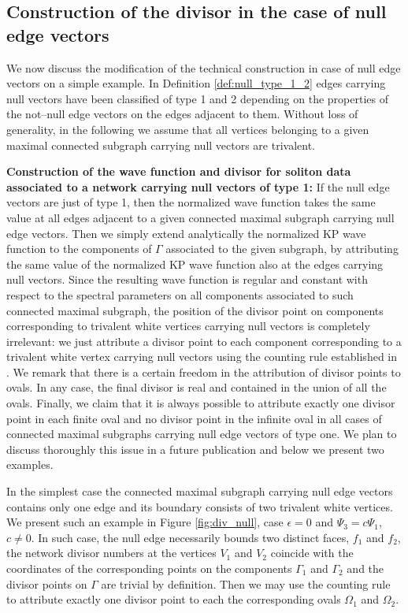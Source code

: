 \documentclass[11pt]{amsart}
\theoremstyle{plain}
\numberwithin{equation}{section}
\begin{document}
\subsection{Construction of the divisor in the case of null edge vectors}\label{sec:constr_null}
We now  discuss the modification of the technical construction in case of null edge vectors on a simple example.
In Definition \ref{def:null_type_1_2} edges carrying null vectors have been classified of type 1 and 2 depending on the properties of the not--null edge vectors on the edges adjacent to them. Without loss of generality, in the following we assume that all vertices belonging to a given maximal connected subgraph carrying null vectors are trivalent.

\textbf{Construction of the wave function and divisor for soliton data associated to a network carrying null vectors of type 1:}
If the null edge vectors are just of type 1, then the normalized wave function takes the same value at all edges adjacent to a given connected maximal subgraph carrying null edge vectors. Then we simply extend analytically the normalized KP wave function to the components of $\Gamma$ associated to the given subgraph, by attributing the same value of the normalized KP wave function also at the edges carrying null vectors. Since the resulting wave function is regular and constant with respect to the spectral parameters on all components associated to such connected maximal subgraph, 
the position of the divisor point on components corresponding to trivalent white vertices carrying null vectors is completely irrelevant: we just attribute a divisor point to each component corresponding to a trivalent white vertex carrying null vectors using the counting rule established in \cite{AG1}. We remark that there is a certain freedom in the attribution of divisor points to ovals. In any case, the final divisor is real and contained in the union of all the ovals. Finally, we claim that it is always possible to attribute exactly one divisor point in each finite oval and no divisor point in the infinite oval in all cases of connected maximal subgraphs carrying null edge vectors of type one. We plan to discuss thoroughly this issue in a future publication and below we present two examples.

In the simplest case the connected maximal subgraph carrying null edge vectors contains only one edge and its boundary consists of two trivalent white vertices. We present such an example in Figure \ref{fig:div_null}, case $\epsilon =0$ and $\Psi_3 = c \Psi_1$, $c\not =0$. In such case, the null edge necessarily bounds two distinct faces, $f_1$ and $f_2$, the network divisor numbers at the vertices $V_1$ and $V_2$ coincide with the coordinates of the corresponding points on the components $\Gamma_1$ and $\Gamma_2$ and the divisor points on $\Gamma$ are trivial by definition. Then we may use the counting rule to attribute exactly one divisor point to each the corresponding ovals $\Omega_1$ and $\Omega_2$. 
\end{document}
